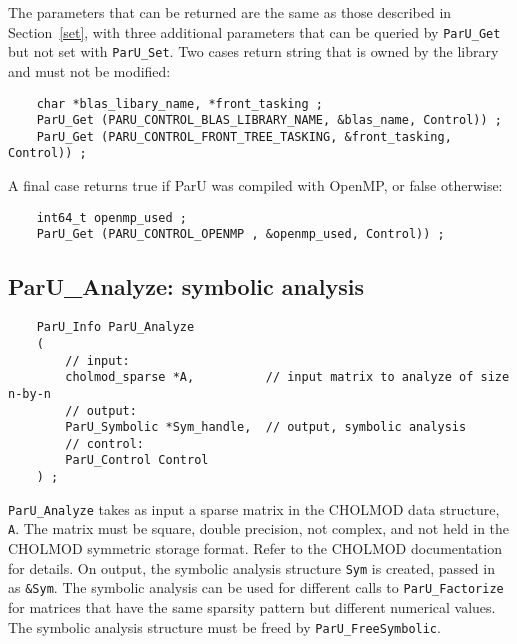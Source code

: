 \documentclass[12pt]{article}
\begin{document}
The parameters that can be returned are the same as those described in
Section~\ref{set}, with three additional parameters that can be queried by
\verb'ParU_Get' but not set with \verb'ParU_Set'.  Two cases return string that
is owned by the library and must not be modified:

    {\footnotesize
    \begin{verbatim}
    char *blas_libary_name, *front_tasking ;
    ParU_Get (PARU_CONTROL_BLAS_LIBRARY_NAME, &blas_name, Control)) ;
    ParU_Get (PARU_CONTROL_FRONT_TREE_TASKING, &front_tasking, Control)) ; \end{verbatim}}

A final case returns true if ParU was compiled with OpenMP, or false otherwise:

    {\footnotesize
    \begin{verbatim}
    int64_t openmp_used ;
    ParU_Get (PARU_CONTROL_OPENMP , &openmp_used, Control)) ; \end{verbatim}}

\subsection{{\sf ParU\_Analyze}: symbolic analysis}

    {\footnotesize
    \begin{verbatim}
    ParU_Info ParU_Analyze
    (
        // input:
        cholmod_sparse *A,          // input matrix to analyze of size n-by-n
        // output:
        ParU_Symbolic *Sym_handle,  // output, symbolic analysis
        // control:
        ParU_Control Control
    ) ; \end{verbatim}}

    \verb'ParU_Analyze' takes as input a sparse matrix in the CHOLMOD data
    structure, \verb'A'.  The matrix must be square, double precision, not
    complex, and not held in the CHOLMOD symmetric storage format.  Refer to
    the CHOLMOD documentation for details.  On output, the symbolic analysis
    structure \verb'Sym' is created, passed in as \verb'&Sym'.  The symbolic
    analysis can be used for different calls to \verb'ParU_Factorize' for
    matrices that have the same sparsity pattern but different numerical
    values.  The symbolic analysis structure must be freed by
    \verb'ParU_FreeSymbolic'.

\end{document}
